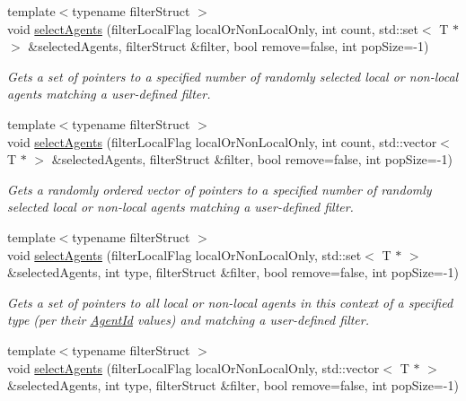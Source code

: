 \begin{DoxyCompactItemize}
{\footnotesize template$<$typename filter\-Struct $>$ }\\void \hyperlink{classrepast_1_1_shared_context_aeef53be1cb9b12ad298e7e965c2ef22a}{select\-Agents} (filter\-Local\-Flag local\-Or\-Non\-Local\-Only, int count, std\-::set$<$ T $\ast$ $>$ \&selected\-Agents, filter\-Struct \&filter, bool remove=false, int pop\-Size=-\/1)
\begin{DoxyCompactList}\small\item\em Gets a set of pointers to a specified number of randomly selected local or non-\/local agents matching a user-\/defined filter. \end{DoxyCompactList}\item 
{\footnotesize template$<$typename filter\-Struct $>$ }\\void \hyperlink{classrepast_1_1_shared_context_ad18c4ca72c9b7a59998c8c3856052a73}{select\-Agents} (filter\-Local\-Flag local\-Or\-Non\-Local\-Only, int count, std\-::vector$<$ T $\ast$ $>$ \&selected\-Agents, filter\-Struct \&filter, bool remove=false, int pop\-Size=-\/1)
\begin{DoxyCompactList}\small\item\em Gets a randomly ordered vector of pointers to a specified number of randomly selected local or non-\/local agents matching a user-\/defined filter. \end{DoxyCompactList}\item 
{\footnotesize template$<$typename filter\-Struct $>$ }\\void \hyperlink{classrepast_1_1_shared_context_a629bb877939f1a3ddbe85c8198d4bdfe}{select\-Agents} (filter\-Local\-Flag local\-Or\-Non\-Local\-Only, std\-::set$<$ T $\ast$ $>$ \&selected\-Agents, int type, filter\-Struct \&filter, bool remove=false, int pop\-Size=-\/1)
\begin{DoxyCompactList}\small\item\em Gets a set of pointers to all local or non-\/local agents in this context of a specified type (per their \hyperlink{classrepast_1_1_agent_id}{Agent\-Id} values) and matching a user-\/defined filter. \end{DoxyCompactList}\item 
{\footnotesize template$<$typename filter\-Struct $>$ }\\void \hyperlink{classrepast_1_1_shared_context_a4e9ef25609d51784de8eb8634e7256d4}{select\-Agents} (filter\-Local\-Flag local\-Or\-Non\-Local\-Only, std\-::vector$<$ T $\ast$ $>$ \&selected\-Agents, int type, filter\-Struct \&filter, bool remove=false, int pop\-Size=-\/1)

\end{DoxyCompactItemize}
